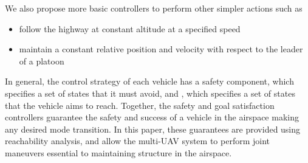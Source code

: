 We also propose more basic controllers to perform other simpler actions such as
\begin{itemize}
\item follow the highway at constant altitude at a specified speed
\item maintain a constant relative position and velocity with respect to the leader of a platoon
\end{itemize}

In general, the control strategy of each vehicle has a safety component, which specifies a set of states that it must avoid, and , which specifies a set of states that the vehicle aims to reach. Together, the safety and goal satisfaction controllers guarantee the safety and success of a vehicle in the airspace making any desired mode transition. In this paper, these guarantees are provided using reachability analysis, and allow the multi-UAV system to perform joint maneuvers essential to maintaining structure in the airspace.